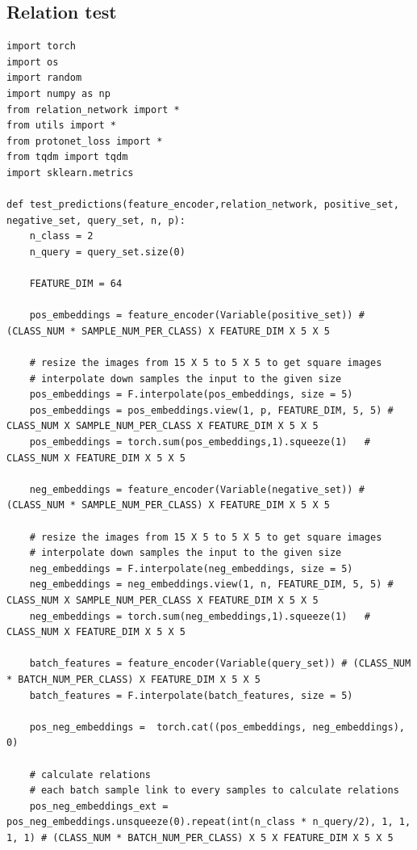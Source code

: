 \documentclass[12pt,a4paper,titlepage]{article}
\begin{document}
\subsection{Relation test}
\begin{lstlisting}[language=iPython,firstnumber=1, caption=relation\_test.py, label=relation test,captionpos=b]
import torch
import os
import random
import numpy as np
from relation_network import *
from utils import *
from protonet_loss import *
from tqdm import tqdm
import sklearn.metrics

def test_predictions(feature_encoder,relation_network, positive_set, negative_set, query_set, n, p):
    n_class = 2
    n_query = query_set.size(0)

    FEATURE_DIM = 64

    pos_embeddings = feature_encoder(Variable(positive_set)) # (CLASS_NUM * SAMPLE_NUM_PER_CLASS) X FEATURE_DIM X 5 X 5

    # resize the images from 15 X 5 to 5 X 5 to get square images
    # interpolate down samples the input to the given size
    pos_embeddings = F.interpolate(pos_embeddings, size = 5)
    pos_embeddings = pos_embeddings.view(1, p, FEATURE_DIM, 5, 5) # CLASS_NUM X SAMPLE_NUM_PER_CLASS X FEATURE_DIM X 5 X 5
    pos_embeddings = torch.sum(pos_embeddings,1).squeeze(1)   # CLASS_NUM X FEATURE_DIM X 5 X 5

    neg_embeddings = feature_encoder(Variable(negative_set)) # (CLASS_NUM * SAMPLE_NUM_PER_CLASS) X FEATURE_DIM X 5 X 5

    # resize the images from 15 X 5 to 5 X 5 to get square images
    # interpolate down samples the input to the given size
    neg_embeddings = F.interpolate(neg_embeddings, size = 5)
    neg_embeddings = neg_embeddings.view(1, n, FEATURE_DIM, 5, 5) # CLASS_NUM X SAMPLE_NUM_PER_CLASS X FEATURE_DIM X 5 X 5
    neg_embeddings = torch.sum(neg_embeddings,1).squeeze(1)   # CLASS_NUM X FEATURE_DIM X 5 X 5
    
    batch_features = feature_encoder(Variable(query_set)) # (CLASS_NUM * BATCH_NUM_PER_CLASS) X FEATURE_DIM X 5 X 5
    batch_features = F.interpolate(batch_features, size = 5)
    
    pos_neg_embeddings =  torch.cat((pos_embeddings, neg_embeddings), 0)

    # calculate relations
    # each batch sample link to every samples to calculate relations
    pos_neg_embeddings_ext = pos_neg_embeddings.unsqueeze(0).repeat(int(n_class * n_query/2), 1, 1, 1, 1) # (CLASS_NUM * BATCH_NUM_PER_CLASS) X 5 X FEATURE_DIM X 5 X 5
    

\end{lstlisting}
\end{document}
